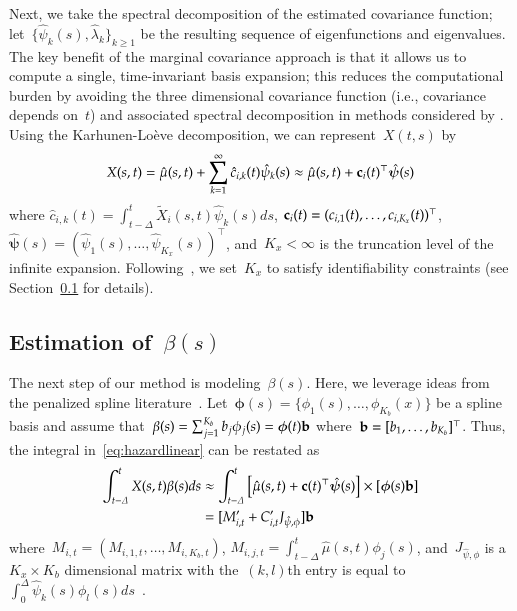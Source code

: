\documentclass[12pt]{amsart}
\begin{document}
Next, we take the spectral decomposition of the estimated covariance
function; let~$\{ \hat \psi_k (s),\hat \lambda_k \}_{k \geq 1}$ be the
resulting sequence of eigenfunctions and eigenvalues. 
The key benefit of the marginal covariance approach is that it allows
us to compute a single, time-invariant basis expansion; this reduces
the computational burden by avoiding the three dimensional covariance
function (i.e., covariance depends on~$t$) and associated spectral
decomposition in methods considered by \cite{ChenMuller2012}.
Using the Karhunen-Lo{\`e}ve decomposition, we can represent~$X(t,s)$
by
\[
X(s,t) = \hat \mu(s,t) + \sum_{k=1}^{\infty} \hat c_{i,k} (t) \hat
\psi_k (s) \approx \hat \mu(s,t) + {\bf c}_{i} (t)^\top \mathbold{\hat
  \psi} (s)
\]
where $\hat c_{i,k} (t) = \int_{t-\Delta}^t \tilde X_i (s,t) \hat
\psi_k (s) ds$, ${\bf c}_i (t) = (c_{i,1} (t), \ldots, c_{i,K_x}
(t))^\top$, $\mathbold{\hat \psi} (s) = (\hat \psi_1 (s), \ldots, \hat
\psi_{K_x} (s))^\top$, and~$K_x < \infty$ is the truncation level of
the infinite expansion. Following~\cite{Goldsmith2011}, we set~$K_x$
to satisfy identifiability constraints (see Section~\ref{section:beta}
for details).  


\subsection{Estimation of~$\beta(s)$}
\label{section:beta}

The next step of our method is modeling~$\beta(s)$. Here, we leverage
ideas from the penalized spline literature~\citep{Ruppert2003,
  Wood2006book}. Let~$\mathbold{\phi} (s) = \{ \phi_1 (s), \ldots,
\phi_{K_b} (x) \}$ be a spline basis and assume that~$\beta(s) =
\sum_{j=1}^{K_b} b_j \phi_{j} (s) = \mathbold{\phi} (t) {\bf b}$
where~${\bf b} = [b_1, \ldots, b_{K_b}]^{\top}$. Thus, the integral
in~\eqref{eq:hazardlinear} can be restated as 
\begin{align*}
\int_{t-\Delta}^t X(s,t) \beta(s) ds 
  &\approx \int_{t-\Delta}^t \left[ \hat \mu(s,t) + {\bf c} (t)^\top
    \mathbold{\hat \psi} (s) \right] \times \left[
    \mathbold{\phi} (s) {\bf b} \right] \\
  &= [ M_{i,t}^\prime + C_{i,t}^\prime J_{\hat \psi, \phi} ] {\bf b}
\end{align*}
where~$M_{i,t} = (M_{i,1,t}, \ldots, M_{i,K_b,t})$, $M_{i,j,t}
= \int_{t-\Delta}^t \hat \mu (s,t) \phi_j (s)$, and~$J_{\hat \psi,
  \phi}$ is a $K_x \times K_b$ dimensional matrix with the~$(k,l)$th
entry is equal to~$\int_{0}^\Delta \hat \psi_k (s) \phi_l (s)
ds$~\citep{RamsaySilverman2005}.
\end{document}
